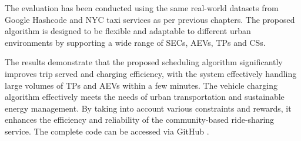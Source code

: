 The evaluation has been conducted using the same real-world datasets from Google Hashcode and NYC taxi services as per previous chapters. The proposed algorithm is designed to be flexible and adaptable to different urban environments by supporting a wide range of SECs, AEVs, TPs and CSs. 

The results demonstrate that the proposed scheduling algorithm significantly improves trip served and charging efficiency, with the system effectively handling large volumes of TPs and AEVs within a few minutes. The vehicle charging algorithm effectively meets the needs of urban transportation and sustainable energy management. By taking into account various constraints and rewards, it enhances the efficiency and reliability of the community-based ride-sharing service. The complete code can be accessed via GitHub \cite{rewardcharging}.

